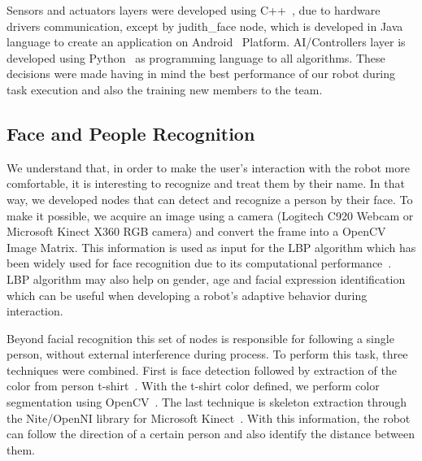 Sensors and actuators layers were developed using C++~\cite{stroustrup:1986}, due to hardware drivers communication, except by judith\_face node, which is developed in Java~\cite{joy:2000} language to create an application on Android~\cite{android:2016} Platform. AI/Controllers layer is developed using Python~\cite{vanrossum:2010} as programming language to all algorithms. These decisions were made having in mind the best performance of our robot during task execution and also the training new members to the team.

\subsection{Face and People Recognition}\label{face-people-recognition}
We understand that, in order to make the user's interaction with the robot more comfortable, it is interesting to recognize and treat them by their name. In that way, we developed nodes that can detect and recognize a person by their face. To make it possible, we acquire an image using a camera (Logitech C920 Webcam or Microsoft Kinect X360 RGB camera) and convert the frame into a OpenCV~\cite{bradski:2000} Image Matrix. This information is used as input for the LBP algorithm which has been widely used for face recognition due to its computational performance~\cite{ahonen:2006,yang:2007,shan:2012,ylioinas:2012,samadi:2013}. LBP algorithm may also help on gender, age and facial expression identification which can be useful when developing a robot's adaptive behavior during interaction.

Beyond facial recognition this set of nodes is responsible for following a single person, without external interference during process. To perform this task, three techniques were combined. First is face detection followed by extraction of the color from person t-shirt~\cite{pulli:2012,laganiere:2011,baggio:2012}. With the t-shirt color defined, we perform color segmentation using OpenCV~\cite{kang:2008,oliveira:2009,culjak:2012}. The last technique is skeleton extraction through the Nite/OpenNI library for Microsoft Kinect~\cite{openni:2011}. With this information, the robot can follow the direction of a certain person and also identify the distance between them.

